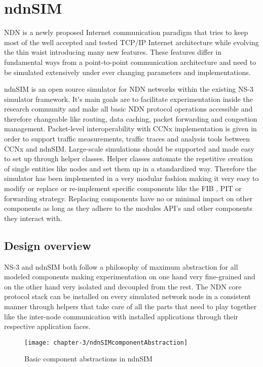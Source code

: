 \chapter{ndnSIM}

NDN is a newly proposed Internet communication paradigm that tries to keep most of the well accepted and tested TCP/IP Internet architecture while evolving the thin waist introducing many new features. These features differ in fundamental ways from a point-to-point communication architecture and need to be simulated extensively under ever changing parameters and implementations.

ndnSIM is an open source simulator for NDN networks within the existing NS-3 simulator framework. It's main goals are to facilitate experimentation inside the research community and make all basic NDN protocol operations accessible and therefore changeable like routing, data caching, packet forwarding and congestion management. Packet-level interoperability with CCNx implementation is given in order to support traffic measurements, traffic traces and analysis tools between CCNx and ndnSIM. Large-scale simulations should be supported and made easy to set up through helper classes. Helper classes automate the repetitive creation of single entities like nodes and set them up in a standardized way. Therefore the simulator has been implemented in a very modular fashion making it very easy to modify or replace or re-implement specific components like the FIB , PIT or forwarding strategy. Replacing components have no or minimal impact on other components as long as they adhere to the modules API's and other components they interact with.

\section{Design overview}

NS-3 and ndnSIM both follow a philosophy of maximum abstraction for all modeled components making experimentation on one hand very fine-grained and on the other hand very isolated and decoupled from the rest. The NDN core protocol stack can be installed on every simulated network node in a consistent manner through helpers that take care of all the parts that need to play together like the inter-node communication with installed applications through their respective application faces.

\begin{figure}[H]
  \centering
  \texttt{[image: chapter-3/ndnSIMcomponentAbstraction]}
  \caption{Basic component abstractions in ndnSIM}
  \label{fig:ndnSIMcomponentAbstraction}
\end{figure}

